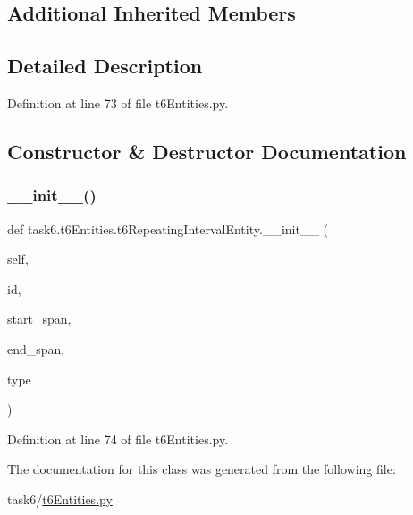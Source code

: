 \subsection*{Additional Inherited Members}


\subsection{Detailed Description}


Definition at line 73 of file t6\+Entities.\+py.



\subsection{Constructor \& Destructor Documentation}
\mbox{\label{classtask6_1_1t6Entities_1_1t6RepeatingIntervalEntity_a2b821296d1afa9e5d79e3082a11e27d6}} 
\subsubsection{\texorpdfstring{\+\_\+\+\_\+init\+\_\+\+\_\+()}{\_\_init\_\_()}}
{\footnotesize\ttfamily def task6.\+t6\+Entities.\+t6\+Repeating\+Interval\+Entity.\+\_\+\+\_\+init\+\_\+\+\_\+ (\begin{DoxyParamCaption}\item[{}]{self,  }\item[{}]{id,  }\item[{}]{start\+\_\+span,  }\item[{}]{end\+\_\+span,  }\item[{}]{type }\end{DoxyParamCaption})}



Definition at line 74 of file t6\+Entities.\+py.



The documentation for this class was generated from the following file\+:\begin{DoxyCompactItemize}
\item 
task6/\hyperlink{t6Entities_8py}{t6\+Entities.\+py}\end{DoxyCompactItemize}

